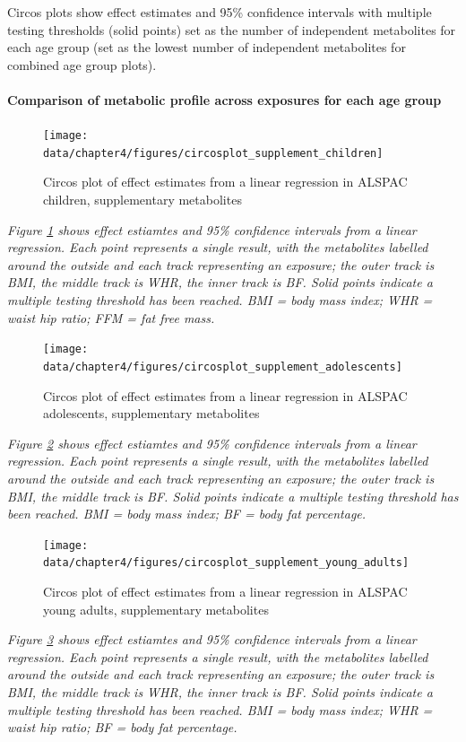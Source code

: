 \documentclass[11pt,twoside]{bristolthesis}
\newcommand{\bsmall}{\begin{small}}
\newcommand{\esmall}{\end{small}}
\begin{document}
Circos plots show effect estimates and 95\% confidence intervals with multiple testing thresholds (solid points) set as the number of independent metabolites for each age group (set as the lowest number of independent metabolites for combined age group plots).

\hypertarget{chapter4-appendix-circosplot-supplement2}{%
\paragraph{Comparison of metabolic profile across exposures for each age group}\label{chapter4-appendix-circosplot-supplement2}}
\begin{figure}
\texttt{[image: data/chapter4/figures/circosplot\_supplement\_children]} \caption{Circos plot of effect estimates from a linear regression in ALSPAC children, supplementary metabolites}\label{fig:plot-circos-supplement-children}
\end{figure}
\noindent 
\bsmall
\emph{Figure \ref{fig:plot-circos-supplement-children} shows effect estiamtes and 95\% confidence intervals from a linear regression. Each point represents a single result, with the metabolites labelled around the outside and each track representing an exposure; the outer track is BMI, the middle track is WHR, the inner track is BF. Solid points indicate a multiple testing threshold has been reached. BMI = body mass index; WHR = waist hip ratio; FFM = fat free mass.}
\esmall

\newpage
\begin{figure}
\texttt{[image: data/chapter4/figures/circosplot\_supplement\_adolescents]} \caption{Circos plot of effect estimates from a linear regression in ALSPAC adolescents, supplementary metabolites}\label{fig:plot-circos-supplement-adolescents}
\end{figure}
\noindent 
\bsmall
\emph{Figure \ref{fig:plot-circos-supplement-adolescents} shows effect estiamtes and 95\% confidence intervals from a linear regression. Each point represents a single result, with the metabolites labelled around the outside and each track representing an exposure; the outer track is BMI, the middle track is BF. Solid points indicate a multiple testing threshold has been reached. BMI = body mass index; BF = body fat percentage.}
\esmall

\newpage
\begin{figure}
\texttt{[image: data/chapter4/figures/circosplot\_supplement\_young\_adults]} \caption{Circos plot of effect estimates from a linear regression in ALSPAC young adults, supplementary metabolites}\label{fig:plot-circos-supplement-young-adults}
\end{figure}
\noindent 
\bsmall
\emph{Figure \ref{fig:plot-circos-supplement-young-adults} shows effect estiamtes and 95\% confidence intervals from a linear regression. Each point represents a single result, with the metabolites labelled around the outside and each track representing an exposure; the outer track is BMI, the middle track is WHR, the inner track is BF. Solid points indicate a multiple testing threshold has been reached. BMI = body mass index; WHR = waist hip ratio; BF = body fat percentage.}
\esmall
\end{document}
